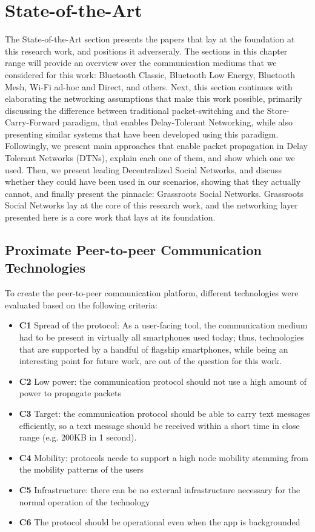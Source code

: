 \chapter{State-of-the-Art}
\label{chap:sota}

The State-of-the-Art section presents the papers that lay at the foundation at this research work, and positions it adverseraly. The sections in this chapter range will provide an overview over the communication mediums that we considered for this work: Bluetooth Classic, Bluetooth Low Energy, Bluetooth Mesh, Wi-Fi ad-hoc and Direct, and others. Next, this section continues with elaborating the networking assumptions that make this work possible, primarily discussing the difference between traditional packet-switching and the Store-Carry-Forward paradigm, that enables Delay-Tolerant Networking, while also presenting similar systems that have been developed using this paradigm. Followingly, we present main approaches that enable packet propagation in Delay Tolerant Networks (DTNs), explain each one of them, and show which one we used. Then, we present leading Decentralized Social Networks, and discuss whether they could have been used in our scenarios, showing that they actually cannot, and finally present the pinnacle: Grassroots Social Networks. Grassroots Social Networks lay at the core of this research work, and the networking layer presented here is a core work that lays at its foundation.

\section{Proximate Peer-to-peer Communication Technologies}
\label{sec:proximate-p2p-protocols}
To create the peer-to-peer communication platform, different technologies were evaluated based on the following criteria:
\begin{itemize}
    \item \textbf{C1} Spread of the protocol: As a user-facing tool, the communication medium had to be present in virtually all smartphones used today; thus, technologies that are supported by a handful of flagship smartphones, while being an interesting point for future work, are out of the question for this work.
    \item \textbf{C2} Low power: the communication protocol should not use a high amount of power to propagate packets
    \item \textbf{C3} Target: the communication protocol should be able to carry text messages efficiently, so a text message should be received within a short time in close range (e.g. 200KB in 1 second). 
    \item \textbf{C4} Mobility: protocols neede to support a high node mobility stemming from the mobility patterns of the users
    \item \textbf{C5} Infrastructure: there can be no external infrastructure necessary for the normal operation of the technology
    \item \textbf{C6} The protocol should be operational even when the app is backgrounded
\end{itemize}
